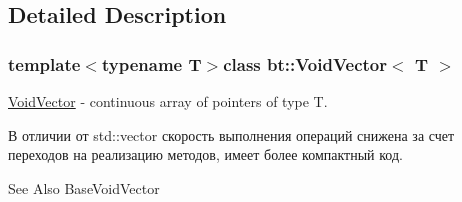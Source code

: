 \subsection{Detailed Description}
\subsubsection*{template$<$typename T$>$class bt\-::\-Void\-Vector$<$ T $>$}

\hyperlink{classbt_1_1_void_vector}{Void\-Vector} -\/ continuous array of pointers of type T. 

В отличии от std\-::vector скорость выполнения операций снижена за счет переходов на реализацию методов, имеет более компактный код.

\begin{DoxySeeAlso}{See Also}
Base\-Void\-Vector 
\end{DoxySeeAlso}
